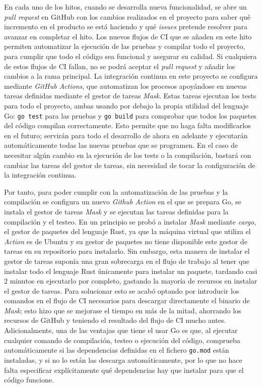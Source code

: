 En cada uno de los hitos, cuando se desarrolla nueva funcionalidad, se abre un
\textit{pull request} en GitHub con los cambios realizados en el proyecto para
saber qué incremento en el producto se está haciendo y qué \textit{issues}
pretende resolver para avanzar en completar el hito. Los nuevos flujos de CI que
se añaden en este hito permiten automatizar la ejecución de las pruebas y
compilar todo el proyecto, para cumplir que todo el código sea funcional y
asegurar su calidad. Si cualquiera de estos flujos de CI fallan, no se podrá
aceptar el \textit{pull request} y añadir los cambios a la rama principal. La
integración continua en este proyecto se configura mediante \textit{GitHub
Actions}, que automatizan los procesos apoyándose en nuevas tareas definidas
mediante el gestor de tareas \textit{Mask}. Estas tareas ejecutan los tests para
todo el proyecto, ambas usando por debajo la propia utilidad del lenguaje Go:
\texttt{go test} para las pruebas y \texttt{go build} para comprobar que todos
los paquetes del código compilan correctamente. Esto permite que no haga falta
modificarlos en el futuro; servirán para todo el desarrollo de ahora en adelante
y ejecutarán automáticamente todas las nuevas pruebas que se programen. En el
caso de necesitar algún cambio en la ejecución de los tests o la compilación,
bastará con cambiar las tareas del gestor de tareas, sin necesidad de tocar la
configuración de la integración continua.

Por tanto, para poder cumplir con la automatización de las pruebas y la
compilación se configura un nuevo \textit{Github Action} en el que se prepara
Go, se instala el gestor de tareas \textit{Mask} y se ejecutan las tareas
definidas para la compilación y el testeo. En un principio se probó a instalar
\textit{Mask} mediante \textit{cargo}, el gestor de paquetes del lenguaje Rust,
ya que la máquina virtual que utiliza el \textit{Action} es de Ubuntu y su
gestor de paquetes no tiene disponible este gestor de tareas en su repositorio
para instalarlo. Sin embargo, esta manera de instalar el gestor de tareas
suponía una gran sobrecarga en el flujo de trabajo al tener que instalar todo el
lenguaje Rust únicamente para instalar un paquete, tardando casi 2 minutos en
ejecutarlo por completo, gastando la mayoría de recursos en instalar el gestor
de tareas. Para solucionar esto se acabó optando por introducir los comandos en
el flujo de CI necesarios para descargar directamente el binario de
\textit{Mask}; esto hizo que se mejorase el tiempo en más de la mitad, ahorrando
los recursos de GitHub y teniendo el resultado del flujo de CI mucho antes.
Adicionalmente, una de las ventajas que tiene el usar Go es que, al ejecutar
cualquier comando de compilación, testeo o ejecución del código, comprueba
automáticamente si las dependencias definidas en el fichero \texttt{go.mod}
están instaladas, y si no lo están las descarga automáticamente, por lo que no
hace falta especificar explícitamente qué dependencias hay que instalar para que
el código funcione.

